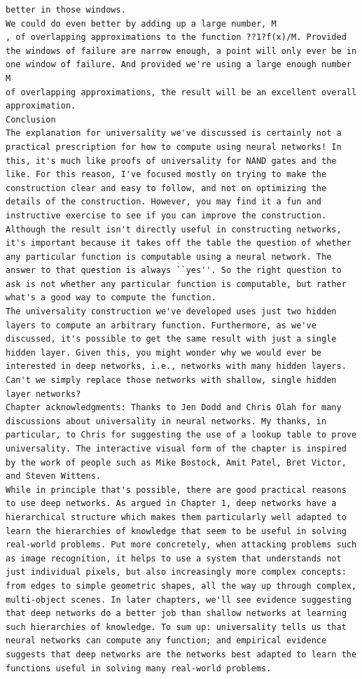 \begin{lstlisting}
better in those windows.
We could do even better by adding up a large number, M
, of overlapping approximations to the function ??1?f(x)/M. Provided the windows of failure are narrow enough, a point will only ever be in one window of failure. And provided we're using a large enough number M
of overlapping approximations, the result will be an excellent overall approximation.
Conclusion
The explanation for universality we've discussed is certainly not a practical prescription for how to compute using neural networks! In this, it's much like proofs of universality for NAND gates and the like. For this reason, I've focused mostly on trying to make the construction clear and easy to follow, and not on optimizing the details of the construction. However, you may find it a fun and instructive exercise to see if you can improve the construction.
Although the result isn't directly useful in constructing networks, it's important because it takes off the table the question of whether any particular function is computable using a neural network. The answer to that question is always ``yes''. So the right question to ask is not whether any particular function is computable, but rather what's a good way to compute the function.
The universality construction we've developed uses just two hidden layers to compute an arbitrary function. Furthermore, as we've discussed, it's possible to get the same result with just a single hidden layer. Given this, you might wonder why we would ever be interested in deep networks, i.e., networks with many hidden layers. Can't we simply replace those networks with shallow, single hidden layer networks?
Chapter acknowledgments: Thanks to Jen Dodd and Chris Olah for many discussions about universality in neural networks. My thanks, in particular, to Chris for suggesting the use of a lookup table to prove universality. The interactive visual form of the chapter is inspired by the work of people such as Mike Bostock, Amit Patel, Bret Victor, and Steven Wittens. 
While in principle that's possible, there are good practical reasons to use deep networks. As argued in Chapter 1, deep networks have a hierarchical structure which makes them particularly well adapted to learn the hierarchies of knowledge that seem to be useful in solving real-world problems. Put more concretely, when attacking problems such as image recognition, it helps to use a system that understands not just individual pixels, but also increasingly more complex concepts: from edges to simple geometric shapes, all the way up through complex, multi-object scenes. In later chapters, we'll see evidence suggesting that deep networks do a better job than shallow networks at learning such hierarchies of knowledge. To sum up: universality tells us that neural networks can compute any function; and empirical evidence suggests that deep networks are the networks best adapted to learn the functions useful in solving many real-world problems.

\end{lstlisting}
